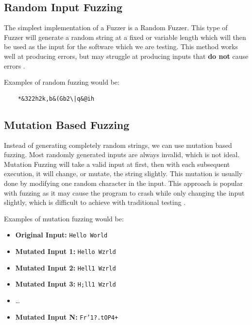 \documentclass[a4paper,12pt]{article}
\begin{document}
\subsection{Random Input Fuzzing}
The simplest implementation of a Fuzzer is a Random Fuzzer. This type of Fuzzer will generate a random string at a fixed or variable length which will then be used 
as the input for the software which we are testing. This method works well at producing errors, but may struggle at producing inputs that \textbf{do not} cause errors \cite{fuzzingbook2024:Fuzzer:RandomInputs}. 

Examples of random fuzzing would be:
\begin{BVerbatim}
    *&322h2k,b&(Gb2\|q&@ih
\end{BVerbatim}



\subsection{Mutation Based Fuzzing}
Instead of generating completely random strings, we can use mutation based fuzzing. Most randomly generated inputs are always invalid, which is not ideal. 
Mutation Fuzzing will take a valid input at first, then with each subsequent execution, it will change, or mutate, the string slightly. This mutation is usually done 
by modifying one random character in the input. This approach is popular with fuzzing as it may cause the program to crash while only changing the input slightly, 
which is difficult to achieve with traditional testing \cite{fuzzingbook2023:MutationFuzzer}.

Examples of mutation fuzzing would be:
\begin{itemize}
    \item \textbf{Original Input:} \texttt{Hello World}
    \item \textbf{Mutated Input 1:} \texttt{Hello Wzrld}
    \item \textbf{Mutated Input 2:} \texttt{Hell1 Wzrld}
    \item \textbf{Mutated Input 3:} \texttt{H;ll1 Wzrld}
    \item \dots
    \item \textbf{Mutated Input N:} \texttt{Fr'1?.tOP4+}
\end{itemize}

\newpage

\printbibliography
\end{document}
